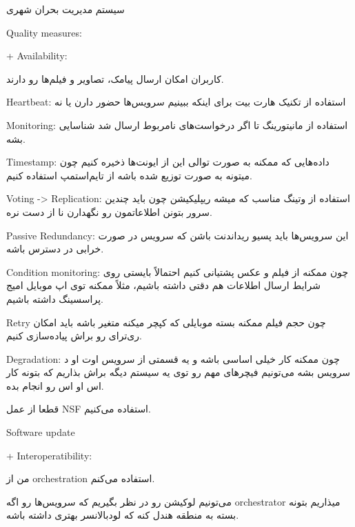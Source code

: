 سیستم مدیریت بحران شهری

Quality measures:

+ Availability:

کاربران امکان ارسال پیامک، تصاویر و فیلم‌ها رو دارند.

Heartbeat:
استفاده از تکنیک هارت بیت برای اینکه ببینیم سرویس‌ها حضور دارن یا نه

Monitoring:
استفاده از مانیتورینگ تا اگر درخواست‌های نامربوط ارسال شد شناسایی بشه.

Timestamp:
داده‌هایی که ممکنه به صورت توالی این از ایونت‌ها ذخیره کنیم چون میتونه به صورت
توزیع شده باشه از تایم‌استمپ استفاده کنیم.

Voting -> Replication:
استفاده از وتینگ مناسب که میشه ریپلیکیشن چون باید چندین سرور بتونن اطلاعاتمون رو
نگهدارن نا از دست نره.

Passive Redundancy:
این سرویس‌ها باید پسیو ریداندنت باشن که سرویس در صورت خرابی در دسترس باشه.

Condition monitoring:
چون ممکنه از فیلم و عکس پشتیانی کنیم احتمالاً بایستی روی شرایط ارسال اطلاعات هم
دقتی داشته باشیم، مثلاً ممکنه توی اپ موبایل امیج پراسسینگ داشته باشیم.

Retry
چون حجم فیلم ممکنه بسته موبایلی که کپچر میکنه متغیر باشه باید امکان ری‌ترای رو
براش پیاده‌سازی کنیم.

Degradation:
چون ممکنه کار خیلی اساسی باشه و یه قسمتی از سرویس اوت او د سرویس بشه می‌تونیم
فیچر‌های مهم رو توی یه سیستم دیگه براش بذاریم که بتونه کار اس او اس رو انجام
بده.

قطعا از عمل NSF استفاده می‌کنیم.

Software update

+ Interoperatibility:

من از orchestration استفاده می‌کنم.

می‌تونیم لوکیشن رو در نظر بگیریم که سرویس‌ها رو اگه orchestrator میذاریم بتونه
بسته به منطقه هندل کنه که لود‌بالانسر بهتری داشته باشه.